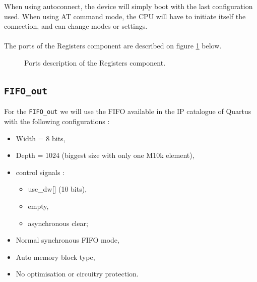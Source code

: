 \documentclass[11pt]{article}
\begin{document}
When using autoconnect, the device will simply boot with the last configuration used. When using AT command mode, the CPU will have to initiate itself the connection, and can change modes or settings.
\\\\
The ports of the Registers component are described on figure \ref{reg_ports} below.
\begin{figure}[H]
        \caption{Ports description of the Registers component.}
        \label{reg_ports}
\end{figure}

\subsection{\texttt{FIFO\_out}}
For the \texttt{FIFO\_out} we will use the FIFO available in the IP catalogue of Quartus with the following configurations :
\begin{itemize}
    \item Width = 8 bits,
    \item Depth = 1024 (biggest size with only one M10k element),
    \item control signals : \begin{itemize}
        \item use\_dw[] (10 bits),
        \item empty,
        \item asynchronous clear; \end{itemize}
    \item Normal synchronous FIFO mode,
    \item Auto memory block type,
    \item No optimisation or circuitry protection.
\end{itemize}
\end{document}
